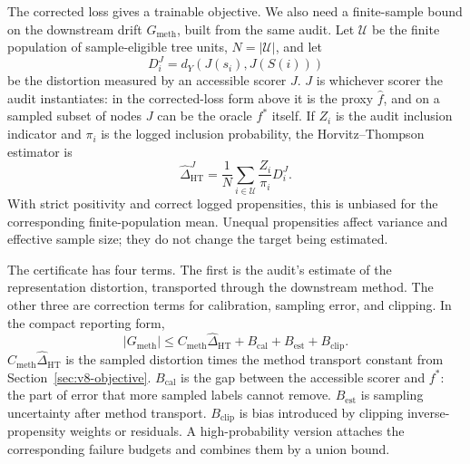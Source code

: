 The corrected loss gives a trainable objective. We also need a
finite-sample bound on the downstream drift \(G_{\mathrm{meth}}\),
built from the same audit. Let \(\mathcal U\) be the finite
population of sample-eligible tree units, \(N=|\mathcal U|\),
and let
\[
  D_i^J
  =
  d_Y\!\left(J(s_i),J(S(i))\right)
\]
be the distortion measured by an accessible scorer \(J\). \(J\) is
whichever scorer the audit instantiates: in the corrected-loss form
above it is the proxy \(\widehat f\), and on a sampled subset of nodes
\(J\) can be the oracle \(f^\ast\) itself. If \(Z_i\) is the audit
inclusion indicator and \(\pi_i\) is the logged inclusion probability,
the Horvitz--Thompson estimator is
\begin{equation}
\label{eq:v8-ht-distortion}
  \widehat{\Delta}_{\mathrm{HT}}^{J}
  =
  \frac{1}{N}
  \sum_{i\in\mathcal U}
  \frac{Z_i}{\pi_i}D_i^J .
\end{equation}
With strict positivity and correct logged propensities, this is
unbiased for the corresponding finite-population mean. Unequal
propensities affect variance and effective sample size; they do not
change the target being estimated.

The certificate has four terms. The first is the audit's estimate of
the representation distortion, transported through the downstream
method. The other three are correction terms for calibration, sampling
error, and clipping. In the compact reporting form,
\begin{equation}
\label{eq:v8-finite-sample-certificate}
  |G_{\mathrm{meth}}|
  \le
  C_{\mathrm{meth}}\widehat{\Delta}_{\mathrm{HT}}
  +
  B_{\mathrm{cal}}
  +
  B_{\mathrm{est}}
  +
  B_{\mathrm{clip}} .
\end{equation}
\(C_{\mathrm{meth}}\widehat{\Delta}_{\mathrm{HT}}\) is the sampled
distortion times the method transport constant from
Section~\ref{sec:v8-objective}. \(B_{\mathrm{cal}}\) is the gap
between the accessible scorer and \(f^\ast\): the part of error that
more sampled labels cannot remove. \(B_{\mathrm{est}}\) is sampling
uncertainty after method transport. \(B_{\mathrm{clip}}\) is bias
introduced by clipping inverse-propensity weights or residuals. A
high-probability version attaches the corresponding failure budgets
and combines them by a union bound.

